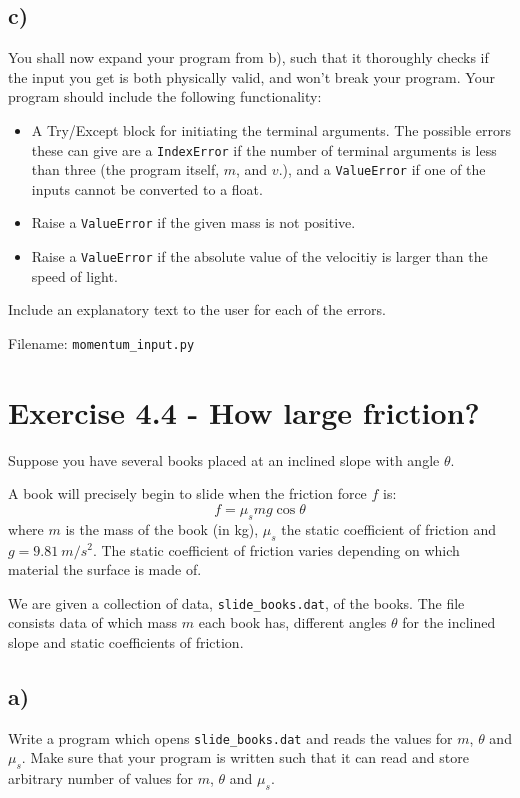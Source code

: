 \documentclass[10pt,a4paper]{article}
\begin{document}
\subsection*{c)}
You shall now expand your program from b), such that it thoroughly checks if the input you get is both physically valid, and won't break your program. Your program should include the following functionality:
\begin{itemize}
\item A Try/Except block for initiating the terminal arguments. The possible errors these can give are a \texttt{IndexError} if the number of terminal arguments is less than three (the program itself, $m$, and $v$.), and a \texttt{ValueError} if one of the inputs cannot be converted to a float.
\item Raise a \texttt{ValueError} if the given mass is not positive.
\item Raise a \texttt{ValueError} if the absolute value of the velocitiy is larger than the speed of light.
\end{itemize}

Include an explanatory text to the user for each of the errors.

Filename: \texttt{momentum\_input.py}



\section*{Exercise 4.4 - How large friction?}
Suppose you have several books placed at an inclined slope with angle $\theta$. 

A book will precisely begin to slide when the friction force $f$ is:
\[
f = \mu_smg\cos\theta
\]
where $m$ is the mass of the book (in \si{\kg}), $\mu_s$ the static coefficient of friction and $g = \SI{9.81}{m/s^2}$.
The static coefficient of friction varies depending on which material the surface is made of. 

We are given a collection of data, \texttt{slide\_books.dat}, of the books. The file consists data of which mass $m$ each book has, different angles $\theta$ for the inclined slope and static coefficients of friction. 

\subsection*{a)}
Write a program which opens \texttt{slide\_books.dat} and reads the values for $m$, $\theta$ and $\mu_s$. Make sure that your program is written such that it can read and store arbitrary number of values for $m$, $\theta$ and $\mu_s$. 
\end{document}
